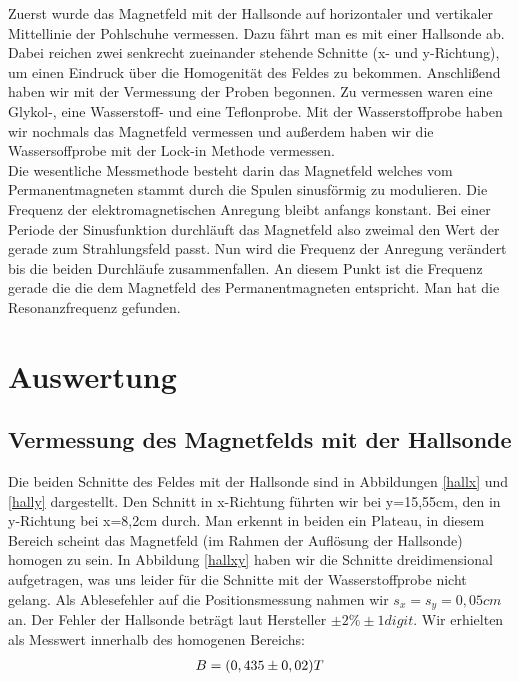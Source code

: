 \documentclass[12pt]{article}
\begin{document}
Zuerst wurde das Magnetfeld mit der Hallsonde auf horizontaler und vertikaler Mittellinie der Pohlschuhe vermessen.
Dazu fährt man es mit einer Hallsonde ab. Dabei reichen zwei senkrecht zueinander stehende Schnitte (x- und y-Richtung), um einen Eindruck über die Homogenität des Feldes zu bekommen.
 Anschlißend haben wir mit der Vermessung der Proben begonnen. Zu vermessen waren eine Glykol-, eine Wasserstoff- und eine Teflonprobe. Mit der Wasserstoffprobe haben wir nochmals das Magnetfeld vermessen und außerdem haben wir die Wassersoffprobe mit der Lock-in Methode vermessen.\\


Die wesentliche Messmethode besteht darin das Magnetfeld welches vom Permanentmagneten stammt durch die Spulen sinusförmig zu modulieren. Die Frequenz der elektromagnetischen Anregung bleibt anfangs konstant. Bei einer Periode der Sinusfunktion durchläuft das Magnetfeld also zweimal den Wert der gerade zum Strahlungsfeld passt. Nun wird die Frequenz der Anregung verändert bis die beiden Durchläufe zusammenfallen. An diesem Punkt ist die Frequenz gerade die die dem Magnetfeld des Permanentmagneten entspricht. Man hat die Resonanzfrequenz gefunden.


\section{Auswertung}
\subsection{Vermessung des Magnetfelds mit der Hallsonde}
Die beiden Schnitte des Feldes mit der Hallsonde sind in Abbildungen \ref{hallx} und \ref{hally} dargestellt. Den Schnitt in x-Richtung führten wir bei y=15,55cm, den in y-Richtung bei x=8,2cm durch. Man erkennt in beiden ein Plateau, in diesem Bereich scheint das Magnetfeld (im Rahmen der Auflösung der Hallsonde) homogen zu sein. In Abbildung \ref{hallxy} haben wir die Schnitte dreidimensional aufgetragen, was uns leider für die Schnitte mit der Wasserstoffprobe nicht gelang. Als Ablesefehler auf die Positionsmessung nahmen wir $s_x = s_y = 0,05cm$ an. Der Fehler der Hallsonde beträgt laut Hersteller $\pm 2\% \pm 1digit$. Wir erhielten als Messwert innerhalb des homogenen Bereichs:
\begin{align}
 \notag B=(0,435 \pm 0,02) T
\end{align}
\end{document}
